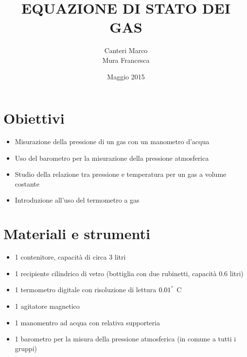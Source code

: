\documentclass[12pt,titlepage]{article}
\title{\textbf{EQUAZIONE DI STATO DEI GAS} }
\author{Canteri Marco\\Mura Francesca}
\date{Maggio 2015}
\begin{document}
	\maketitle
	\tableofcontents
	\renewcommand{\abstractname}{Abstract}
	
	\begin{abstract}
	
	\end{abstract}
	
\newpage
\section{Obiettivi}
\begin{itemize}
\item Misurazione della pressione di un gas con un manometro d'acqua
\item Uso del barometro per la misurazione della pressione atmosferica
\item Studio della relazione tra pressione e temperatura per un gas a volume costante
\item Introduzione all'uso del termometro a gas
\end{itemize}

\section{Materiali e strumenti}
\begin{itemize}
\item 1 contenitore, capacità di circa 3 litri
\item 1 recipiente cilindrico di vetro (bottiglia con due rubinetti, capacità 0.6 litri)
\item 1 termometro digitale con risoluzione di lettura $0.01^{\degree}$ C
\item 1 agitatore magnetico
\item 1 manomentro ad acqua con relativa supporteria
\item 1 barometro per la misura della pressione atmosferica (in comune a tutti i gruppi)
\end{itemize}

\newpage

\end{document}
